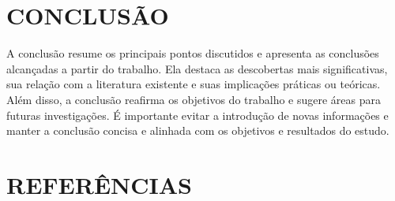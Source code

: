 \documentclass{iftex2024}
\begin{document}
\chapter{CONCLUSÃO}

A conclusão resume os principais pontos discutidos e apresenta as conclusões alcançadas a partir do trabalho.
Ela destaca as descobertas mais significativas, sua relação com a literatura existente e suas implicações práticas ou teóricas.
Além disso, a conclusão reafirma os objetivos do trabalho e sugere áreas para futuras investigações.
É importante evitar a introdução de novas informações e manter a conclusão concisa e alinhada com os objetivos e resultados do estudo.

\chapter*{REFERÊNCIAS}

\printbibliography
\end{document}
